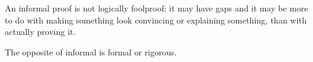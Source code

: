 An informal proof is not logically foolproof; it may have 
gaps and it may be more to do with making something
look convincing or explaining something, than with
actually proving it.
\par
The opposite of informal is formal or rigorous.